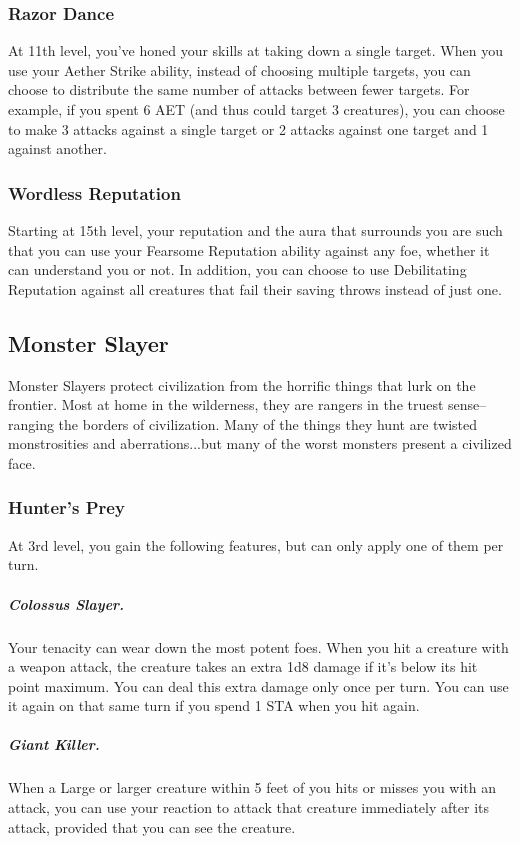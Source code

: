 \subsubsection{Razor Dance}
At 11th level, you've honed your skills at taking down a single target. When you use your Aether Strike ability, instead of choosing multiple targets, you can choose to distribute the same number of attacks between fewer targets. For example, if you spent 6 AET (and thus could target 3 creatures), you can choose to make 3 attacks against a single target or 2 attacks against one target and 1 against another.

\subsubsection{Wordless Reputation}
Starting at 15th level, your reputation and the aura that surrounds you are such that you can use your Fearsome Reputation ability against any foe, whether it can understand you or not. In addition, you can choose to use Debilitating Reputation against all creatures that fail their saving throws instead of just one.

\subsection{Monster Slayer}
Monster Slayers protect civilization from the horrific things that lurk on the frontier. Most at home in the wilderness, they are rangers in the truest sense--ranging the borders of civilization. Many of the things they hunt are twisted monstrosities and aberrations...but many of the worst monsters present a civilized face. 

\subsubsection{Hunter's Prey}

At 3rd level, you gain the following features, but can only apply one of them per turn.

\subparagraph*{Colossus Slayer.} Your tenacity can wear down the most potent foes. When you hit a creature with a weapon attack, the creature takes an extra 1d8 damage if it's below its hit point maximum. You can deal this extra damage only once per turn. You can use it again on that same turn if you spend 1 STA when you hit again.

\subparagraph*{Giant Killer.} When a Large or larger creature within 5 feet of you hits or misses you with an attack, you can use your reaction to attack that creature immediately after its attack, provided that you can see the creature.

